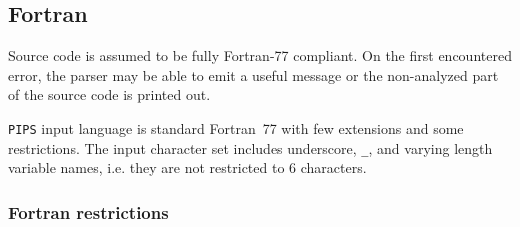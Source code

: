 \documentclass[a4paper]{report}
\newcommand{\Pips}{\texttt{PIPS}}
\begin{document}
\subsection{Fortran}
\label{sec:fortran}


Source code is assumed to be fully Fortran-77
compliant. On the first encountered error, the parser may be able to
emit a useful message or the non-analyzed part of the source code is
printed out.

\Pips{} input language is standard Fortran~77 with few extensions and some
restrictions. The input character set includes underscore, \verb/_/, and
varying length variable names, i.e. they are not restricted to 6
characters.

\subsubsection{Fortran restrictions}
\end{document}

